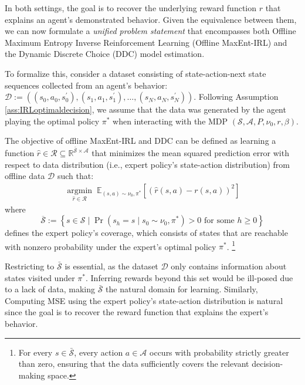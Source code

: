 In both settings, the goal is to recover the underlying reward function $r$ that explains an agent's demonstrated behavior. Given the equivalence between them, we can now formulate a \textit{unified problem statement} that encompasses both Offline Maximum Entropy Inverse Reinforcement Learning (Offline MaxEnt-IRL) and the Dynamic Discrete Choice (DDC) model estimation. 

To formalize this, consider a dataset consisting of state-action-next state sequences collected from an agent's behavior:  
$\mathcal{D}:=\left(\left(s_0, a_0, s_0^\prime\right), \left(s_1, a_1,s_1^\prime\right), \ldots,  \left(s_N, a_N,s_N^\prime\right)\right)$. 
Following Assumption \ref{ass:IRLoptimaldecision}, we assume that the data was generated by the agent playing the optimal policy $\pi^*$ when interacting with the MDP $\left(\mathcal{S}, \mathcal{A}, P, \nu_0, r, \beta\right)$.
\begin{defn}\label{def:IRLproblem}

    The objective of offline MaxEnt-IRL and DDC can be defined as learning a function $\hat{r}\in\mathcal{R} \subseteq\mathbb{R}^{\bar{\mathcal{S}}\times \mathcal{A}}$ that minimizes the mean squared prediction error with respect to data distribution (i.e., expert policy's state-action distribution) from offline data $\mathcal{D}$ such that: 
\begin{align}
    \underset{\hat{r}\in \mathcal{R}}{\operatorname{argmin}} \; \mathbb{E}_{(s,a)\sim \nu_0, \pi^*}[(\hat{r}(s,a)-r(s,a))^2] \label{eq:rObjective}    
\end{align}
where 
$$\overline{\mathcal{S}}:=\left\{s \in \mathcal{S} \mid \operatorname{Pr}\left(s_h=s \mid s_0 \sim \nu_0, \pi^*\right)>0 \text { for some } h \geq 0\right\}$$ defines the expert policy's coverage, which consists of states that are reachable with nonzero probability under the expert's optimal policy \(\pi^*\). \footnote{For every \(s \in \bar{\mathcal{S}}\), every action \(a \in \mathcal{A}\) occurs with probability strictly greater than zero, ensuring that the data sufficiently covers the relevant decision-making space.}  
\end{defn}
Restricting to \(\bar{\mathcal{S}}\) is essential, as the dataset \(\mathcal{D}\) only contains information about states visited under \(\pi^*\). Inferring rewards beyond this set would be ill-posed due to a lack of data, making \(\bar{\mathcal{S}}\) the natural domain for learning. Similarly, Computing MSE using the expert policy's state-action distribution is natural since the goal is to recover the reward function that explains the expert’s behavior. 



